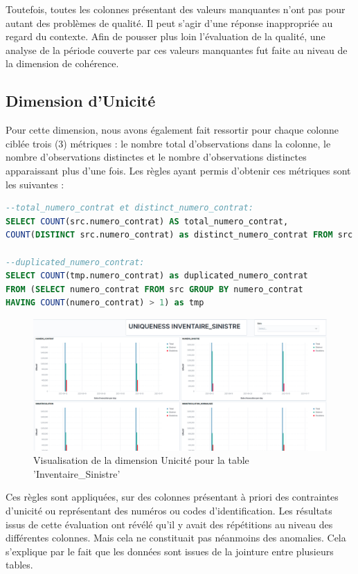 Toutefois, toutes les colonnes pr\'esentant des valeurs manquantes n'ont pas pour autant des probl\`emes de qualit\'e. Il peut s'agir d'une r\'eponse inappropri\'ee au regard du contexte. Afin de pousser plus loin l'\'evaluation de la qualit\'e, une analyse de la p\'eriode couverte par ces valeurs manquantes fut faite au niveau de la dimension de coh\'erence.

\subsection{Dimension d'Unicit\'e}
Pour cette dimension, nous avons \'egalement fait ressortir pour chaque colonne cibl\'ee trois (3) m\'etriques :  le nombre total d'observations dans la colonne, le nombre d'observations distinctes et le nombre d'observations distinctes apparaissant plus d'une fois. Les r\`egles ayant permis d'obtenir ces m\'etriques sont les suivantes : 
\newpage
\begin{lstlisting}[language=SQL,caption={R\`egles de la Dimension Unicit\'e},captionpos=t,showspaces=false,basicstyle=\scriptsize,numbers=none,commentstyle=\color{gray},backgroundcolor=\color{background}]
--total_numero_contrat et distinct_numero_contrat: 
SELECT COUNT(src.numero_contrat) AS total_numero_contrat, 
COUNT(DISTINCT src.numero_contrat) as distinct_numero_contrat FROM src 

--duplicated_numero_contrat: 
SELECT COUNT(tmp.numero_contrat) as duplicated_numero_contrat 
FROM (SELECT numero_contrat FROM src GROUP BY numero_contrat 
HAVING COUNT(numero_contrat) > 1) as tmp
\end{lstlisting}

\begin{figure}[H]
        \caption{Visualisation de la dimension Unicit\'e pour la table 'Inventaire\_Sinistre'}  \label{fig:tttay}
    \begin{center}
      \includegraphics[scale = 0.27]{Main/Static/Uniqueness_Inventaire_Sinistre.png} 
    \end{center}
\end{figure}
Ces r\`egles sont appliqu\'ees, sur des colonnes pr\'esentant \`a priori des contraintes d'unicit\'e ou repr\'esentant des num\'eros ou codes d'identification. Les r\'esultats issus de cette \'evaluation ont r\'ev\'el\'e qu'il y avait des r\'ep\'etitions au niveau des diff\'erentes colonnes. Mais cela ne constituait pas n\'eanmoins des anomalies. Cela s'explique par le fait que les donn\'ees sont issues de la jointure entre plusieurs tables.



